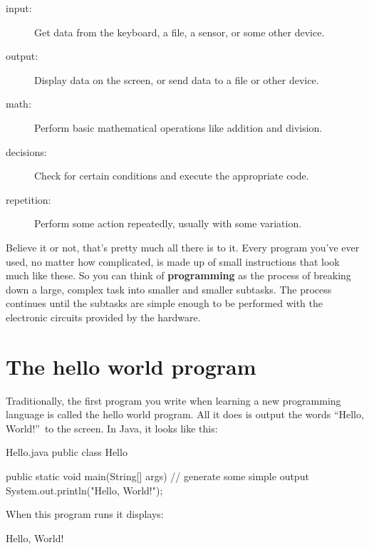 \begin{description}
\item[input:] Get data from the keyboard, a file, a sensor, or some other device.
\item[output:] Display data on the screen, or send data to a file or other device.
\item[math:] Perform basic mathematical operations like addition and division.
\item[decisions:] Check for certain conditions and execute the appropriate code.
\item[repetition:] Perform some action repeatedly, usually with some variation.
\end{description}


Believe it or not, that's pretty much all there is to it.
Every program you've ever used, no matter how complicated, is made up of small instructions that look much like these.
So you can think of {\bf programming} as the process of breaking down a large, complex task into smaller and smaller subtasks.
The process continues until the subtasks are simple enough to be performed with the electronic circuits provided by the hardware.


\section{The hello world program}
\label{hello}

Traditionally, the first program you write when learning a new programming language is called the hello world program.
All it does is output the words ``Hello, World!''\ to the screen.
In Java, it looks like this:



\begin{trinket}[235]{Hello.java}
public class Hello {

    public static void main(String[] args) {
        // generate some simple output
        System.out.println("Hello, World!");
    }
}
\end{trinket}

When this program runs it displays:

\begin{stdout}
Hello, World!
\end{stdout}


